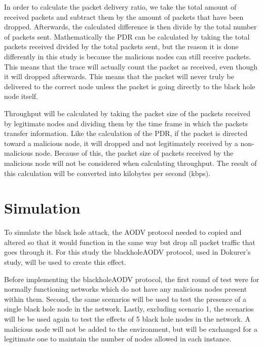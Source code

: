 \documentclass[conference,12pt]{IEEEtran}
\begin{document}
In order to calculate the packet delivery ratio, we take the total amount of received packets and subtract them by the amount of packets that have been dropped. Afterwards, the calculated difference is then divide by the total number of packets sent. Mathematically the PDR can be calculated by taking the total packets received divided by the total packets sent, but the reason it is done differently in this study is because the malicious nodes can still receive packets. This means that the trace will actually count the packet as received, even though it will dropped afterwards. This means that the packet will never truly be delivered to the correct node unless the packet is going directly to the black hole node itself.

Throughput will be calculated by taking the packet size of the packets received by legitimate nodes and dividing them by the time frame in which the packets transfer information. Like the calculation of the PDR, if the packet is directed toward a malicious node, it will dropped and not legitimately received by a non-malicious node. Because of this, the packet size of packets received by the malicious node will not be considered when calculating throughput. The result of this calculation will be converted into kilobytes per second (kbps).
\section{Simulation}
To simulate the black hole attack, the AODV protocol needed to copied and altered so that it would function in the same way but drop all packet traffic that goes through it. For this study the blackholeAODV protocol, used in Dokurer's study, will be used to create this effect.

Before implementing the blackholeAODV protocol, the first round of test were for normally functioning networks which do not have any malicious nodes present within them. Second, the same scenarios will be used to test the presence of a single black hole node in the network. Lastly, excluding scenario 1, the scenarios will be be used again to test the effects of 5 black hole nodes in the network. A malicious node will not be added to the environment, but will be exchanged for a legitimate one to maintain the number of nodes allowed in each instance.
\end{document}
